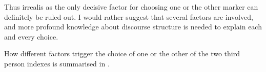 Thus irrealis as the only decisive factor for choosing one or the other marker can definitely be ruled out. I would rather suggest that several factors are involved, and more profound knowledge about discourse structure is needed to explain each and every choice.

How different factors trigger the choice of one or the other of the two third person indexes is summarised in .

\begin{figure}


\end{figure}

